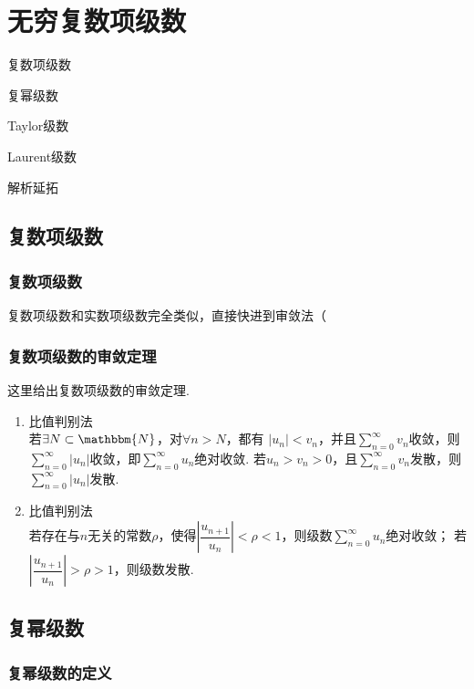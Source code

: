 \chapter{无穷复数项级数}
\begin{introduction}
    \item 复数项级数
    \item 复幂级数
    \item Taylor级数
    \item Laurent级数
    \item 解析延拓
\end{introduction}

\section{复数项级数}
    \subsection{复数项级数}
    复数项级数和实数项级数完全类似，直接快进到审敛法（

    \subsection{复数项级数的审敛定理}
    这里给出复数项级数的审敛定理.
    \begin{enumerate}
        \item 比值判别法\\
                若$\exists N \subset \mathbbm{N}$，对$\forall n > N$，都有
                $|u_n| < v_n$，并且$\sum_{n = 0}^{\infty}v_n$收敛，则$\sum_{n=0}^{\infty}|u_n|$收敛，即$\sum_{n=0}^{\infty}u_n$绝对收敛.
                若$u_n>v_n>0$，且$\sum_{n=0}^{\infty}v_n$发散，则$\sum_{n=0}^{\infty}|u_n|$发散.
        \item 比值判别法\\
                若存在与$n$无关的常数$\rho$，使得$\left|\dfrac{u_{n+1}}{u_n}\right|<\rho<1$，则级数$\sum_{n=0}^{\infty}u_n$绝对收敛；
                若$\left|\dfrac{u_{n+1}}{u_n}\right|>\rho>1$，则级数发散.
    \end{enumerate}

\section{复幂级数}
    \subsection{复幂级数的定义}

